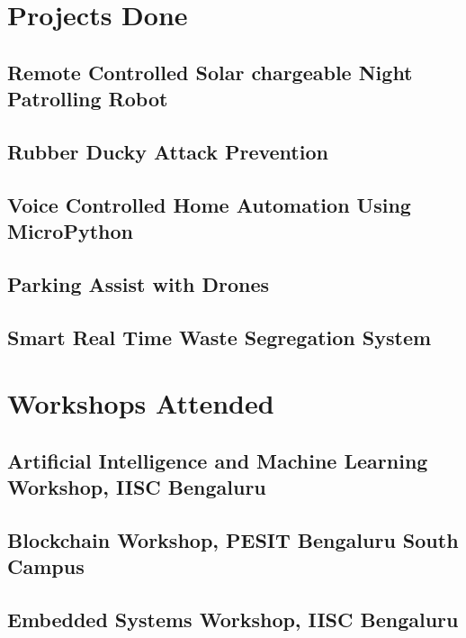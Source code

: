 \documentclass[13pt,a4paper,sans,english]{moderncv}        %
\begin{document}
\section{Projects Done}
\subsection{Remote Controlled Solar chargeable Night Patrolling Robot}

\subsection{Rubber Ducky Attack Prevention}

\subsection{Voice Controlled Home Automation Using MicroPython}

\subsection{Parking Assist with Drones}

\subsection{Smart Real Time Waste Segregation System}

\section{Workshops Attended}
\subsection{Artificial Intelligence and Machine Learning Workshop, IISC Bengaluru}
\subsection{Blockchain Workshop, PESIT Bengaluru South Campus}
\subsection{Embedded Systems Workshop, IISC Bengaluru}
\end{document}
